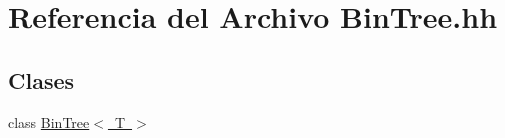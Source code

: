 \hypertarget{_bin_tree_8hh}{}\section{Referencia del Archivo Bin\+Tree.\+hh}
\label{_bin_tree_8hh}
\subsection*{Clases}
\begin{DoxyCompactItemize}
\item 
class \mbox{\hyperlink{class_bin_tree}{Bin\+Tree$<$ T $>$}}
\end{DoxyCompactItemize}
